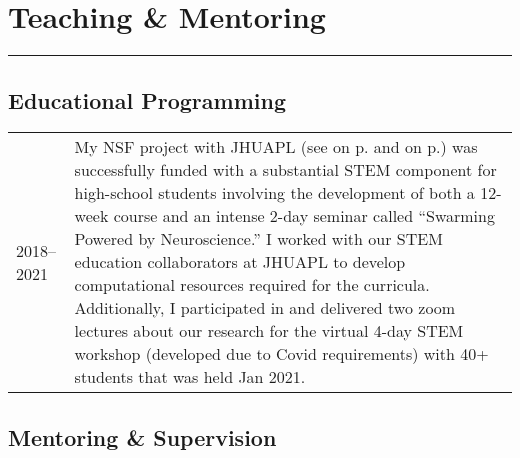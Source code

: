 \documentclass[10pt]{article}
\newcommand{\nameonpdottwo}[2]{\textcolor{hopkinsblue}{\emph{\nameref{sec:#1}} on
  p.\pageref{sec:#1}} and \textcolor{hopkinsblue}{\emph{\nameref{sec:#2}} on p.\pageref{sec:#2}}}
\newcommand{\newsection}[2]{%
  \section*{#1}
  \vspace{-.125in}
  \hrule
  \vspace{.22in}
  \label{sec:#2}
}
\begin{document}
\smallskip
\newsection{Teaching \& Mentoring}{teaching}

\subsection*{Educational Programming}

\begin{tabular}{@{\hspace{0.2in}}l>{\raggedright\arraybackslash}p{}}
  2018--2021 \hspace{0.1in} & My NSF project with JHUAPL (see
  \nameonpdottwo{nsfaward}{nsfgrant}) was successfully funded with a substantial
  STEM component for high-school students involving the development of both
  a 12-week course and an intense 2-day seminar called ``Swarming Powered by
  Neuroscience.'' I worked with our STEM education collaborators at JHUAPL to
  develop computational resources required for the curricula. Additionally, I
  participated in and delivered two zoom lectures about our research for the
  virtual 4-day STEM workshop (developed due to Covid requirements) with 40+
  students that was held Jan 2021.
\end{tabular}

\pagebreak
\subsection*{Mentoring \& Supervision}
\end{document}
